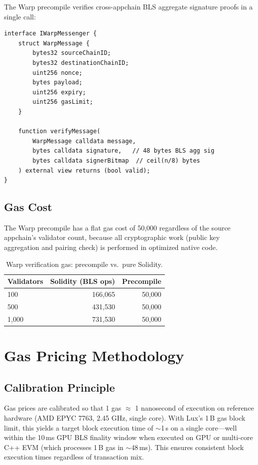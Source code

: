 \documentclass[11pt,a4paper]{article}
\begin{document}
The Warp precompile verifies cross-appchain BLS aggregate signature proofs in a single call:

\begin{lstlisting}[language=Solidity,caption={Warp verification precompile interface.},label={lst:warp}]
interface IWarpMessenger {
    struct WarpMessage {
        bytes32 sourceChainID;
        bytes32 destinationChainID;
        uint256 nonce;
        bytes payload;
        uint256 expiry;
        uint256 gasLimit;
    }

    function verifyMessage(
        WarpMessage calldata message,
        bytes calldata signature,   // 48 bytes BLS agg sig
        bytes calldata signerBitmap  // ceil(n/8) bytes
    ) external view returns (bool valid);
}
\end{lstlisting}

\subsection{Gas Cost}

The Warp precompile has a flat gas cost of 50,000 regardless of the source appchain's validator count, because all cryptographic work (public key aggregation and pairing check) is performed in optimized native code.

\begin{table}[H]
\centering
\caption{Warp verification gas: precompile vs.\ pure Solidity.}
\label{tab:warp_gas}
\begin{tabular}{lrr}
\toprule
\textbf{Validators} & \textbf{Solidity (BLS ops)} & \textbf{Precompile} \\
\midrule
100 & 166,065 & 50,000 \\
500 & 431,530 & 50,000 \\
1,000 & 731,530 & 50,000 \\
\bottomrule
\end{tabular}
\end{table}

\section{Gas Pricing Methodology}\label{sec:gas}

\subsection{Calibration Principle}

Gas prices are calibrated so that 1 gas $\approx$ 1 nanosecond of execution on reference hardware (AMD EPYC 7763, 2.45 GHz, single core). With Lux's 1\,B gas block limit, this yields a target block execution time of $\sim$1\,s on a single core---well within the 10\,ms GPU BLS finality window when executed on GPU or multi-core C++ EVM (which processes 1\,B gas in $\sim$48\,ms). This ensures consistent block execution times regardless of transaction mix.
\end{document}
